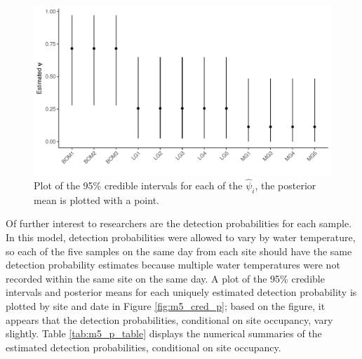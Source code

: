 \documentclass[12pt]{article}\usepackage[]{graphicx}\usepackage[]{color}
\makeatletter
\def\maxwidth{ %
  \ifdim\Gin@nat@width>\linewidth
    \linewidth
  \else
    \Gin@nat@width
  \fi
}
\newenvironment{knitrout}{}{} %
\def\maxwidth{ %
  \ifdim\Gin@nat@width>\linewidth
    \linewidth
  \else
    \Gin@nat@width
  \fi
}
\newenvironment{knitrout}{}{} %
\makeatother
\begin{document}
\begin{figure}
\begin{knitrout}
\color{fgcolor}
\includegraphics[width=\maxwidth]{figure/m5_psi-1} 

\end{knitrout}
\caption{Plot of the 95\% credible intervals for each of the $\hat\psi_i$, the posterior mean is plotted with a point.}
\label{fig:m5_cred_psi}
\end{figure}

Of further interest to researchers are the detection probabilities for each sample. In this model, detection probabilities were allowed to vary by water temperature, so each of the five samples on the same day from each site should have the same detection probability estimates because multiple water temperatures were not recorded within the same site on the same day. A plot of the 95\% credible intervals and posterior means for each uniquely estimated detection probability is plotted by site and date in Figure \ref{fig:m5_cred_p}; based on the figure, it appears that the detection probabilities, conditional on site occupancy, vary slightly. Table \ref{tab:m5_p_table} displays the numerical summaries of the estimated detection probabilities, conditional on site occupancy. 
\end{document}

